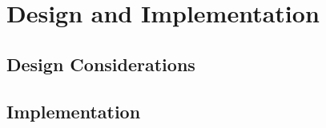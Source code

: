 \section{Design and Implementation}
\label{sec:implementation}

\subsection{Design Considerations}

\subsection{Implementation}